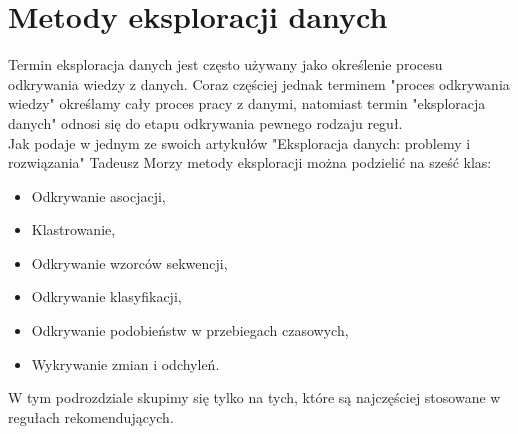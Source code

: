 \documentclass[12pt,a4paper]{report}
\begin{document}
\section{Metody eksploracji danych}
Termin eksploracja danych jest często używany jako określenie procesu odkrywania wiedzy z danych. Coraz częściej jednak terminem  "proces odkrywania wiedzy" określamy cały proces pracy z danymi, natomiast termin "eksploracja danych" odnosi się do etapu odkrywania pewnego rodzaju reguł.
\\Jak podaje w jednym ze swoich artykułów "Eksploracja danych: problemy i rozwiązania" Tadeusz Morzy metody eksploracji można podzielić na sześć klas:
\begin{itemize}
\item Odkrywanie asocjacji,
\item Klastrowanie,
\item Odkrywanie wzorców sekwencji,
\item Odkrywanie klasyfikacji,
\item Odkrywanie podobieństw w przebiegach czasowych,
\item Wykrywanie zmian i odchyleń.
\end{itemize}
W tym podrozdziale skupimy się tylko na tych, które są najczęściej stosowane w regułach rekomendujących.
\end{document}
